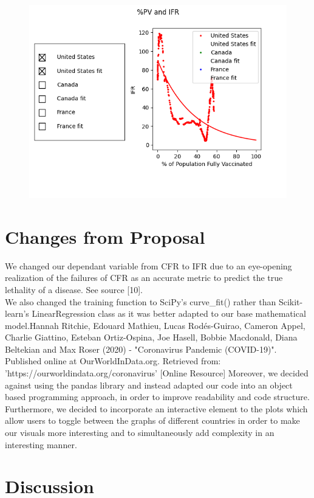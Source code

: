 \documentclass[fontsize=11pt]{article}
\begin{document}
\begin{figure}[htbp]
\centerline{\includegraphics{Figure_2.png}}
\label{fig}
\end{figure}
\section*{Changes from Proposal}


We changed our dependant variable from CFR to IFR due to an eye-opening realization of the failures of CFR as an accurate metric to predict the true lethality of a disease. See source [10]. \\
We also changed the training function to SciPy's curve\_fit() rather than Scikit-learn's LinearRegression class as it was better adapted to our base mathematical model.Hannah Ritchie, Edouard Mathieu, Lucas Rodés-Guirao, Cameron Appel, Charlie Giattino, Esteban Ortiz-Ospina, Joe Hasell, Bobbie Macdonald, Diana Beltekian and Max Roser (2020) - "Coronavirus Pandemic (COVID-19)". Published online at OurWorldInData.org. Retrieved from: 'https://ourworldindata.org/coronavirus' [Online Resource]
Moreover, we decided against using the pandas library and instead adapted our code into an object based programming approach, in order to improve readability and code structure. Furthermore, we decided to incorporate an interactive element to the plots which allow users to toggle between the graphs of different countries in order to make our visuals more interesting and to simultaneously add complexity in an interesting manner.


\section*{Discussion}
\end{document}
